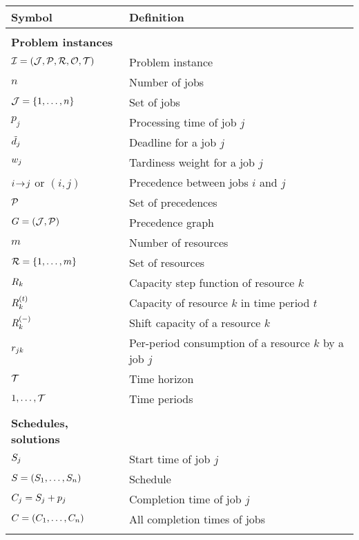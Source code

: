  \label{sec:notation}

\begin{table}[h]
    \centering
    \begin{tabular}{ll}
        \textbf{Symbol} & \textbf{Definition} \\
        \hline

        \\
        \textbf{Problem instances}      & \cellrule \\
        $\mathcal{I} = (\mathcal{J}, \mathcal{P}, \mathcal{R}, \mathcal{O}, \mathcal{T})$ & Problem instance \\
        $n$                             & Number of jobs \\
        $\mathcal{J} = \{ 1, \dots, n \}$     & Set of jobs \\
        $p_j$                           & Processing time of job $j$ \\
        $\tilde{d}_{j}$                  & Deadline for a job $j$ \\
        $w_{j}$           & Tardiness weight for a job $j$ \\
        $i \hspace{-0.2em} \rightarrow \hspace{-0.2em} j$ or $(i,j)$  & Precedence between jobs $i$ and $j$ \\
        $\mathcal{P}$                  & Set of precedences \\
        $G = (\mathcal{J}, \mathcal{P})$     & Precedence graph \\
        $m$                             & Number of resources \\
        $\mathcal{R} = \{1, \dots, m\}$  & Set of resources \\
        $R_{k}$                 & Capacity step function of resource $k$ \\
        $\capacity{k}{t}$               & Capacity of resource $k$ in time period $t$ \\
        $\shiftcapacity{k}$             & Shift capacity of a resource $k$ \\
        $r_{j k}$            & Per-period consumption of a resource $k$ by a job $j$ \\
        $\mathcal{T}$                      & Time horizon \\
        $1, \dots, \mathcal{T}$            & Time periods \\
        \\

        \textbf{Schedules, solutions}   & \cellrule \\
        $S_{j}$                                      & Start time of job $j$ \\
        $S = (S_{1}, \dots, S_{n})$   & Schedule \\
        $C_{j} = S_{j} + p_{j}$          & Completion time of job $j$ \\
        $C = (C_{1}, \dots, C_{n})$    & All completion times of jobs \\
        \\


\end{tabular}
\end{table}
